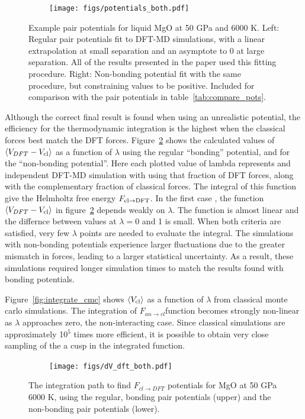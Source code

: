 \begin{figure}[h!]  
    \centering
    \texttt{[image: figs/potentials\_both.pdf]}
\caption{Example pair potentials for liquid MgO at 50 GPa and 6000 K. Left: 
  Regular pair potentials fit to DFT-MD simulations, with a linear
  extrapolation at small separation and an asymptote to 0 at large
  separation.  All of the results presented in the paper used this fitting
  procedure. Right: Non-bonding potential fit with the same procedure, but
  constraining values to be positive. Included for comparison with the pair
  potentials in table~\ref{tab:compare_pots}.}
\label{fig:potentials}
\end{figure}


Although the correct final result is found when using an unrealistic
potential, the efficiency for the thermodynamic integration is the highest
when the classical forces best match the DFT forces.
Figure~\ref{fig:integrate_dft} shows the calculated values of $\left<
V_{DFT} - V_{\rm cl} \right>$ as a function of $\lambda$ using the regular
``bonding'' potential, and for the ``non-bonding potential''. Here each
plotted value of lambda represents and independent DFT-MD simulation with
using that fraction of DFT forces, along with the complementary fraction of
classical forces. The integral of this function give the Helmholtz free
energy $F_{\rm cl \to DFT}$. In the first case , the function $\left<
V_{DFT}-V_{\rm cl}\right>$ in figure~\ref{fig:integrate_dft} depends weakly
on $\lambda$. The function is almost linear and the differnce between
values at $\lambda=0$ and 1 is small. When both criteria are satisfied,
very few $\lambda$ points are needed to evaluate the integral. The
simulations with non-bonding potentials experience larger fluctuations  due
to the greater mismatch in forces, leading to a larger statistical
uncertainty.  As a result, these simulations required longer simulation
times to match the results found with bonding potentials.

Figure~\ref{fig:integrate_cmc} shows $\left< V_{\rm cl} \right>$ as a function
of $\lambda$ from classical monte carlo simulations. The integration of
$F_{an \to cl}$function becomes strongly non-linear as $\lambda$
approaches zero, the non-interacting case. Since classical simulations are
approximately 10$^5$ times more efficient, it is possible to obtain very
close sampling of the a cusp in the integrated function. 

\begin{figure}[h!]  
  \centering
    \texttt{[image: figs/dV\_dft\_both.pdf]}
\caption{The integration path to find $F_{cl \to DFT}$ potentials for MgO
at 50 GPa 6000 K, using the regular, bonding pair potentials (upper) and
the non-bonding pair potentials (lower). }
\label{fig:integrate_dft}
\end{figure}

